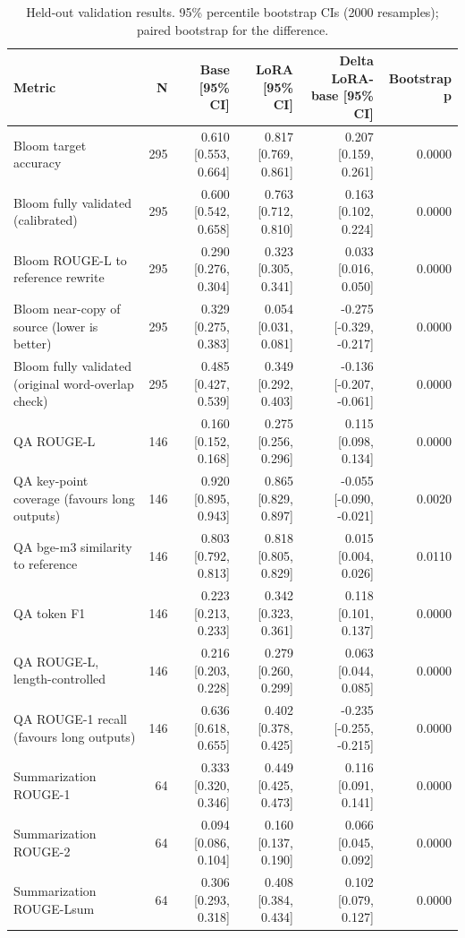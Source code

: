 \begin{table}[t]
\centering
\caption{Held-out validation results. 95\% percentile bootstrap CIs (2000 resamples); paired bootstrap for the difference.}
\label{tab:t3_main_results}
\begin{tabular}{lrrrrr}
\toprule
Metric & N & Base [95\% CI] & LoRA [95\% CI] & Delta LoRA-base [95\% CI] & Bootstrap p \\
\midrule
Bloom target accuracy & 295 & 0.610 [0.553, 0.664] & 0.817 [0.769, 0.861] & 0.207 [0.159, 0.261] & 0.0000 \\
Bloom fully validated (calibrated) & 295 & 0.600 [0.542, 0.658] & 0.763 [0.712, 0.810] & 0.163 [0.102, 0.224] & 0.0000 \\
Bloom ROUGE-L to reference rewrite & 295 & 0.290 [0.276, 0.304] & 0.323 [0.305, 0.341] & 0.033 [0.016, 0.050] & 0.0000 \\
Bloom near-copy of source (lower is better) & 295 & 0.329 [0.275, 0.383] & 0.054 [0.031, 0.081] & -0.275 [-0.329, -0.217] & 0.0000 \\
Bloom fully validated (original word-overlap check) & 295 & 0.485 [0.427, 0.539] & 0.349 [0.292, 0.403] & -0.136 [-0.207, -0.061] & 0.0000 \\
QA ROUGE-L & 146 & 0.160 [0.152, 0.168] & 0.275 [0.256, 0.296] & 0.115 [0.098, 0.134] & 0.0000 \\
QA key-point coverage (favours long outputs) & 146 & 0.920 [0.895, 0.943] & 0.865 [0.829, 0.897] & -0.055 [-0.090, -0.021] & 0.0020 \\
QA bge-m3 similarity to reference & 146 & 0.803 [0.792, 0.813] & 0.818 [0.805, 0.829] & 0.015 [0.004, 0.026] & 0.0110 \\
QA token F1 & 146 & 0.223 [0.213, 0.233] & 0.342 [0.323, 0.361] & 0.118 [0.101, 0.137] & 0.0000 \\
QA ROUGE-L, length-controlled & 146 & 0.216 [0.203, 0.228] & 0.279 [0.260, 0.299] & 0.063 [0.044, 0.085] & 0.0000 \\
QA ROUGE-1 recall (favours long outputs) & 146 & 0.636 [0.618, 0.655] & 0.402 [0.378, 0.425] & -0.235 [-0.255, -0.215] & 0.0000 \\
Summarization ROUGE-1 & 64 & 0.333 [0.320, 0.346] & 0.449 [0.425, 0.473] & 0.116 [0.091, 0.141] & 0.0000 \\
Summarization ROUGE-2 & 64 & 0.094 [0.086, 0.104] & 0.160 [0.137, 0.190] & 0.066 [0.045, 0.092] & 0.0000 \\
Summarization ROUGE-Lsum & 64 & 0.306 [0.293, 0.318] & 0.408 [0.384, 0.434] & 0.102 [0.079, 0.127] & 0.0000 \\

\end{tabular}
\end{table}
